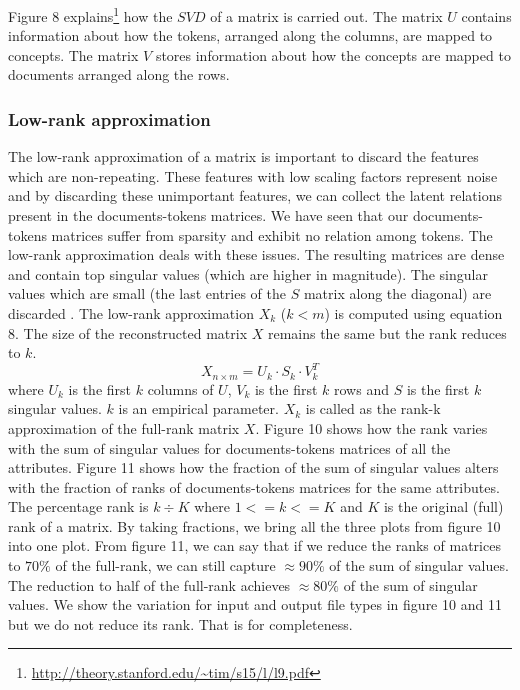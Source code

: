 Figure 8 explains\footnote{\url{http://theory.stanford.edu/~tim/s15/l/l9.pdf}} how the $SVD$ of a matrix is carried out. The matrix $U$ contains information about how the tokens, arranged along the columns, are mapped to concepts. The matrix $V$ stores information about how the concepts are mapped to documents arranged along the rows.

\subsubsection{Low-rank approximation}
The low-rank approximation of a matrix is important to discard the features which are non-repeating. These features with low scaling factors represent noise and by discarding these unimportant features, we can collect the latent relations present in the documents-tokens matrices. We have seen that our documents-tokens matrices suffer from sparsity and exhibit no relation among tokens. The low-rank approximation deals with these issues. The resulting matrices are dense and contain top singular values (which are higher in magnitude). The singular values which are small (the last entries of the $S$ matrix along the diagonal) are discarded \cite{DBLP:journals/corr/Yang15b}. The low-rank approximation $X_k$ ($k<m$) is computed using equation $8$. The size of the reconstructed matrix $X$ remains the same but the rank reduces to $k$.
    \begin{equation}
    X_{n \times m} = U_{k} \cdot S_{k} \cdot V_{k}^T
    \end{equation}
    where $U_{k}$ is the first $k$ columns of $U$, $V_{k}$ is the first $k$ rows and $S$ is the first $k$ singular values. $k$ is an empirical parameter. $X_k$ is called as the rank-k approximation of the full-rank matrix $X$. Figure 10 shows how the rank varies with the sum of singular values for documents-tokens matrices of all the attributes. Figure 11 shows how the fraction of the sum of singular values alters with the fraction of ranks of documents-tokens matrices for the same attributes. The percentage rank is $k \div K$ where $1 <= k <= K$ and $K$ is the original (full) rank of a matrix. By taking fractions, we bring all the three plots from figure 10 into one plot. From figure 11, we can say that if we reduce the ranks of matrices to $70\%$ of the full-rank, we can still capture $\approx 90\%$ of the sum of singular values. The reduction to half of the full-rank achieves $\approx 80\%$ of the sum of singular values. We show the variation for input and output file types in figure 10 and 11 but we do not reduce its rank. That is for completeness.


